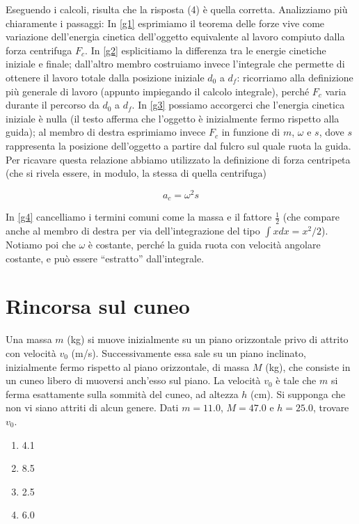 \noindent Eseguendo i calcoli, risulta che la risposta
(4) è quella corretta. Analizziamo più chiaramente i passaggi:
In \ref{g1} esprimiamo il teorema delle forze vive
come variazione dell'energia cinetica dell'oggetto
equivalente al lavoro compiuto dalla forza centrifuga $F_c$.
In \ref{g2} esplicitiamo la differenza tra le energie
cinetiche iniziale e finale; dall'altro membro costruiamo
invece l'integrale che permette di ottenere il lavoro
totale dalla posizione iniziale $d_0$ a $d_f$: ricorriamo
alla definizione più generale di lavoro (appunto impiegando
il calcolo integrale), perché $F_c$ varia durante il
percorso da $d_0$ a $d_f$. In \ref{g3} possiamo accorgerci
che l'energia cinetica iniziale è nulla (il testo afferma
che l'oggetto è inizialmente fermo rispetto alla guida);
al membro di destra esprimiamo invece $F_c$ in funzione
di $m$, $\omega$ e $s$, dove $s$ rappresenta la posizione
dell'oggetto a partire dal fulcro sul quale ruota la guida.
Per ricavare questa relazione
abbiamo utilizzato la definizione di forza centripeta
(che si rivela essere, in modulo, la stessa di quella
centrifuga)

\[ a_c = \omega^2 s \]

\noindent In \ref{g4} cancelliamo i termini comuni
come la massa e il fattore $\frac12$ (che compare
anche al membro di destra per via dell'integrazione
del tipo $\int xdx = x^2/2$). Notiamo poi che $\omega$
è costante, perché la guida ruota con velocità angolare
costante, e può essere ``estratto'' dall'integrale.


\section{Rincorsa sul cuneo}
Una massa $m$ (kg) si muove inizialmente su un piano
orizzontale privo di attrito con velocità $v_0$ (m/s).
Successivamente essa sale su un piano inclinato, inizialmente
fermo rispetto al piano orizzontale, di
massa $M$ (kg), che consiste in un cuneo libero di
muoversi anch'esso sul piano. La velocità $v_0$ è
tale che $m$ si ferma esattamente sulla sommità del
cuneo, ad altezza $h$ (cm). Si supponga che non vi
siano attriti di alcun genere. Dati $m = 11.0$, $M = 47.0$
e $h = 25.0$, trovare $v_0$.

\begin{enumerate}
    \item 4.1
    \item 8.5
    \item 2.5
    \item 6.0
\end{enumerate}

